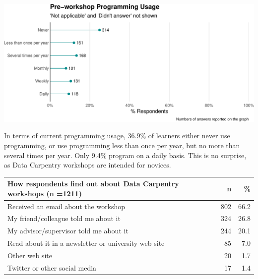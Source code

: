 \documentclass[]{article}
\begin{document}
\includegraphics[width=720]{figures/dc-programming-level-plot-1}

In terms of current programming usage, 36.9\% of learners either never
use programming, or use programming less than once per year, but no more
than several times per year. Only 9.4\% program on a daily basis. This
is no surprise, as Data Carpentry workshops are intended for novices.

\begin{longtable}[]{@{}lrr@{}}
\toprule
How respondents find out about Data Carpentry workshops (n =1211) & n &
\%\tabularnewline
\midrule
\endhead
Received an email about the workshop & 802 & 66.2\tabularnewline
My friend/colleague told me about it & 324 & 26.8\tabularnewline
My advisor/supervisor told me about it & 244 & 20.1\tabularnewline
Read about it in a newsletter or university web site & 85 &
7.0\tabularnewline
Other web site & 20 & 1.7\tabularnewline
Twitter or other social media & 17 & 1.4\tabularnewline
\bottomrule
\end{longtable}
\end{document}
